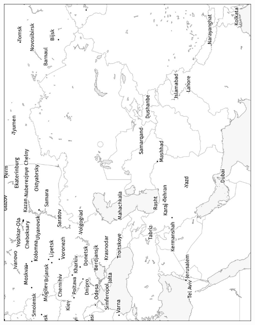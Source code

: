 \begin{minipage}{\textwidth} \includegraphics[width=\textwidth]{maps/Azio-centra.jpg} \end{minipage}
